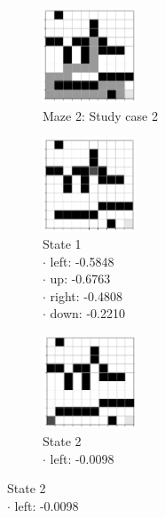 \documentclass[a4paper]{article}    %
\begin{document}
\begin{figure}[H]
    \centering
    \begin{subfigure}{0.24\textwidth}
        \centering
        \includegraphics[width=2.8cm]{maze2-case2}
        \caption{Maze 2: Study case 2 \vspace{12mm}}
        \label{fig:maze2-case2-states}
    \end{subfigure}
    \hfill
    \centering
    \begin{subfigure}{0.24\textwidth}
        \centering
        \includegraphics[width=2.8cm]{maze2-case2-state1}
        \caption{State 1 \\
            \scriptsize
            \hspace*{5mm} $\boldsymbol{\cdot}$ left:  -0.5848 \\
            \hspace*{5mm} $\boldsymbol{\cdot}$ up:    -0.6763 \\
            \hspace*{5mm} $\boldsymbol{\cdot}$ right: -0.4808 \\
            \hspace*{5mm} $\boldsymbol{\cdot}$ down:  -0.2210 }
        \label{fig:maze2-case2-state1}
    \end{subfigure}
    \hfill
    \begin{subfigure}{0.24\textwidth}
        \centering
        \includegraphics[width=2.8cm]{maze2-case2-state2}
        \caption{State 2 \\
            \scriptsize
            \hspace*{5mm} $\boldsymbol{\cdot}$ left:  -0.0098 \\
}
\end{subfigure}
\end{figure}
\end{document}
